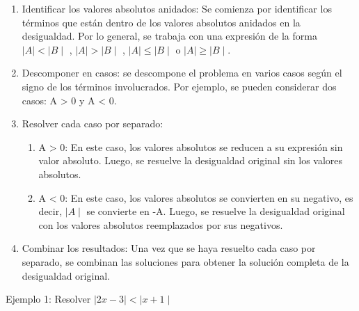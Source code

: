 \documentclass[a4paper,12pt]{article}
\begin{document}
\begin{enumerate}
	\item Identificar los valores absolutos anidados: Se comienza por identificar los términos que están dentro de los valores absolutos anidados en la desigualdad. Por lo general, se trabaja con una expresión de la forma $ \mid A \mid <  \mid B \mid $ , $ \mid A \mid  >  \mid B \mid $ , $ \mid A \mid  \le  \mid B \mid $ o $ \mid A \mid  \ge  \mid B \mid $.

	\item Descomponer en casos: se descompone el problema en varios casos según el signo de los términos involucrados. Por ejemplo, se pueden considerar dos casos: A > 0 y A < 0.

	\item Resolver cada caso por separado:
	\begin{enumerate}
		\item A > 0: En este caso, los valores absolutos se reducen a su expresión sin valor absoluto. Luego, se resuelve la desigualdad original sin los valores absolutos.
		\item A < 0: En este caso, los valores absolutos se convierten en su negativo, es decir,  $\mid A \mid$ se convierte en -A. Luego, se resuelve la desigualdad original con los valores absolutos reemplazados por sus negativos.
	\end{enumerate}

	\item Combinar los resultados: Una vez que se haya resuelto cada caso por separado, se combinan las soluciones para obtener la solución completa de la desigualdad original.

\end{enumerate}

Ejemplo 1: Resolver $ \mid 2x - 3 \mid  <  \mid x + 1 \mid $
\end{document}
